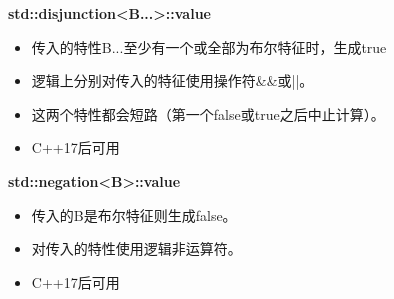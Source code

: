 \textbf{std::disjunction<B...>::value}

\begin{itemize}
\item 
传入的特性B...至少有一个或全部为布尔特征时，生成true

\item 
逻辑上分别对传入的特征使用操作符\&\&或||。

\item 
这两个特性都会短路（第一个false或true之后中止计算）。

\item 
C++17后可用
\end{itemize}

\textbf{std::negation<B>::value}

\begin{itemize}
\item 
传入的B是布尔特征则生成false。

\item 
对传入的特性使用逻辑非运算符。

\item 
C++17后可用
\end{itemize}












